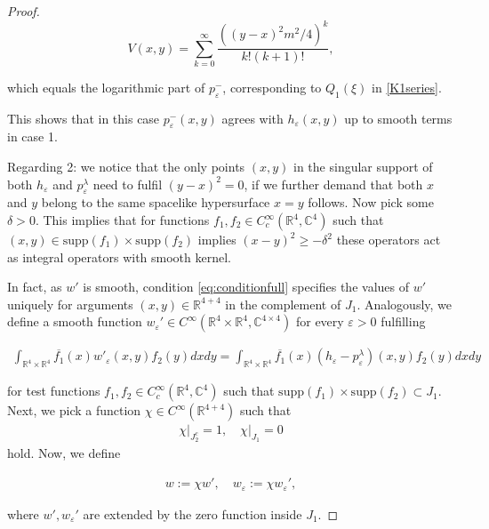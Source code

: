 \documentclass[b5paper,draft,openbib,12pt]{memoir}
\begin{document}
\begin{proof}
\begin{equation}
V(x,y)=\sum_{k=0}^\infty \frac{( (y-x)^2m^2/4)^k}{k! (k+1)!},
\end{equation}

which equals the logarithmic part of \(p^-_\varepsilon\), corresponding to \(Q_1(\xi)\) in \eqref{K1series}. 

This shows that in this case
\(p_\varepsilon^-(x,y)\) agrees with \(h_\varepsilon(x,y)\) up to smooth terms in case 1.
  
Regarding 2: we notice that the only points \((x,y)\) in the singular support  of both \(h_\varepsilon\) and \(p_\varepsilon^{\lambda}\) need to fulfil
\((y-x)^2=0\), if we further demand that both \(x\) and \(y\) belong to the same spacelike hypersurface \(x=y\) follows. 
Now pick some \(\delta>0\).
This implies that for functions \(f_1,f_2\in C_c^\infty(\mathbb{R}^4,\mathbb{C}^4)\) such that \((x,y)\in \mathrm{supp}(f_1)\times\mathrm{supp}(f_2)\) 
implies \((x-y)^2\ge -\delta^2\) these operators act as integral operators with smooth kernel.


In fact, as \(w'\) is smooth, condition \eqref{eq:conditionfull} specifies the values of \(w'\)
uniquely for arguments \((x,y)\in\mathbb{R}^{4+4}\) in the complement of \(J_1\).
Analogously, we define a smooth function \(w_\varepsilon' \in C^\infty(\mathbb{R}^4\times\mathbb{R}^4,\mathbb{C}^{4\times 4})\) for
every \(\varepsilon>0\) fulfilling 

\begin{align}\label{eq:wepsilon_condition}
\int_{\mathbb{R}^4\times\mathbb{R}^4} \overline{f_1}(x) w'_\varepsilon(x,y) f_2(y)dxdy =
\int_{\mathbb{R}^4\times\mathbb{R}^4} \overline{f_1}(x) (h_\varepsilon - p_\varepsilon^\lambda)(x,y) f_2(y)dxdy
\end{align}

for test functions \(f_1,f_2\in C^\infty_c(\mathbb{R}^4,\mathbb{C}^4)\) such that \(\mathrm{supp}(f_1)\times \mathrm{supp}(f_2)\subset J_1\).
Next, we pick a function \(\chi\in C^\infty(\mathbb{R}^{4+4})\) such that 
\begin{align}
\left.\chi \right|_{J_2^c}=1, \quad \left. \chi \right|_{J_1}=0
\end{align}
hold. Now, we define

\begin{align}
w:=\chi w',\quad w_\varepsilon:= \chi w_\varepsilon',
\end{align}

where \(w',w_{\varepsilon}'\) are extended by the zero function inside \(J_1\).


\end{proof}
\end{document}
